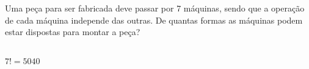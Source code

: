 \begin{ex}
  Uma peça para ser fabricada deve passar por 7 máquinas, sendo que a operação de cada máquina independe das outras. De quantas formas as máquinas podem estar dispostas para montar a peça?
    \begin{sol}
      \phantom{A} \\
      $ 7!=5040$
    \end{sol}
\end{ex}
